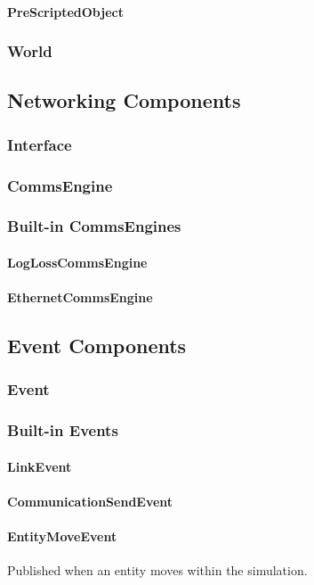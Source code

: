 \documentclass[titlepage]{article}
\begin{document}
\paragraph{PreScriptedObject}
\subsubsection{World}

\subsection{Networking Components}
\subsubsection{Interface}
\subsubsection{CommsEngine}
\subsubsection{Built-in CommsEngines}
\paragraph{LogLossCommsEngine}
\paragraph{EthernetCommsEngine}

\subsection{Event Components}
\subsubsection{Event}
\subsubsection{Built-in Events}
\paragraph{LinkEvent}
\paragraph{CommunicationSendEvent}
\paragraph{EntityMoveEvent}{Published when an entity moves within the simulation.}
\end{document}

